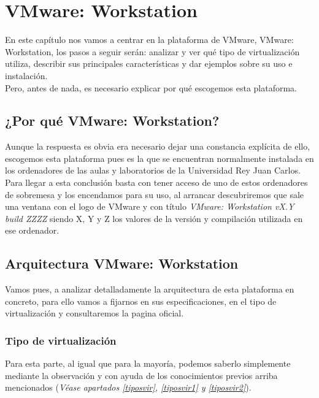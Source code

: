 \chapter{VMware: Workstation}
\lettrine[lines=1,slope=4pt,findent=0pt]{E}{}n este capítulo nos vamos a centrar en la plataforma de VMware, VMware: Workstation\cite{vmwarework}, los pasos a seguir serán: analizar y ver qué tipo de virtualización utiliza, describir sus principales características y dar ejemplos sobre su uso e instalación.\\

Pero, antes de nada, es necesario explicar por qué escogemos esta plataforma.

\section{¿Por qué VMware: Workstation?}
Aunque la respuesta es obvia era necesario dejar una constancia explícita de ello, escogemos esta plataforma pues es la que se encuentran normalmente instalada en los ordenadores de las aulas y laboratorios de la Universidad Rey Juan Carlos.\\

Para llegar a esta conclusión basta con tener acceso de uno de estos ordenadores de sobremesa y los encendamos para su uso, al arrancar descubriremos que sale una ventana con el logo de VMware y con título \emph{VMware: Workstation vX.Y build ZZZZ} siendo X, Y y Z los valores de la versión y compilación utilizada en ese ordenador.

\section{Arquitectura VMware: Workstation}
Vamos pues, a analizar detalladamente la arquitectura de esta plataforma en concreto, para ello vamos a fijarnos en sus especificaciones, en el tipo de virtualización y consultaremos la pagina oficial\cite{vmwarework}\cite{vmwareworkhelp}.

\subsection{Tipo de virtualización}
Para esta parte, al igual que para la mayoría, podemos saberlo simplemente mediante la observación y con ayuda de los conocimientos previos arriba mencionados (\textit{Véase apartados \ref{tiposvir}, \ref{tiposvir1} y \ref{tiposvir2}}).\\

